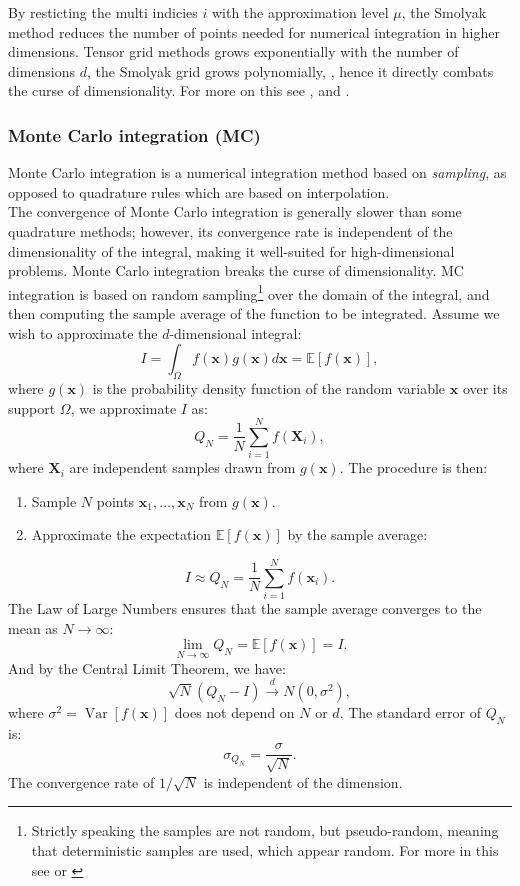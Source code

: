 \documentclass[11pt]{article}
\begin{document}
By resticting the multi indicies \( i \) with the approximation level \( \mu \), the Smolyak method reduces 
the number of points needed for numerical integration in higher dimensions.
Tensor grid methods grows exponentially with the number of dimensions \( d \), the Smolyak grid grows polynomially, \textcite{judd2014smolyak},
hence it directly combats the curse of dimensionality. For more on this see \textcite{smolyak1963}, \textcite{judd2014smolyak} and
\textcite{horneff2016efficient}. 

\subsubsection{Monte Carlo integration (MC)} \label{Subsection: MC}
Monte Carlo integration is a numerical integration method based on \textit{sampling}, as opposed to
quadrature rules which are based on interpolation. \\
The convergence of Monte Carlo integration is generally slower
than some quadrature methods; however, its convergence rate is independent of
the dimensionality of the integral, making it well-suited for high-dimensional problems.
Monte Carlo integration breaks the curse of dimensionality.
\ac{MC} integration is based on random sampling\footnote{Strictly speaking the samples are not random, but pseudo-random, meaning that deterministic samples are used, which appear random. For more in this see \textcite{Judd1998Book} or  \textcite{Glasserman2004MC}}
over the domain of the integral, and then computing the sample average of the function to be integrated.
Assume we wish to approximate the $d$-dimensional integral:
\begin{equation} \label{eq: MC-integral}
  I = \int_{\Omega} f(\mathbf{x}) g(\mathbf{x}) d\mathbf{x} = \mathbb{E}[f(\mathbf{x})],
\end{equation}
where \( g(\mathbf{x}) \) is the probability density function of the random variable \( \mathbf{x} \) over its support \( \Omega \), we approximate \( I \) as:
\begin{equation} \label{eq: MC-integralapproximation}
  Q_N = \frac{1}{N} \sum_{i=1}^{N} f(\mathbf{X}_i),
\end{equation}
where \( \mathbf{X}_i \) are independent samples drawn from \( g(\mathbf{x}) \).
The procedure is then:
\begin{enumerate}
  \item Sample \( N \) points \( \mathbf{x}_1, \ldots, \mathbf{x}_N \) from \( g(\mathbf{x}) \).
  \item Approximate the expectation \( \mathbb{E}[f(\mathbf{x})] \) by the sample average:
\end{enumerate}
\[
I \approx Q_{N} = \frac{1}{N} \sum_{i=1}^{N} f(\mathbf{x}_{i}).
\]
The Law of Large Numbers ensures that the sample average converges to the mean as \( N \to \infty \):
\[
\lim_{{N \to \infty}} Q_{N} = \mathbb{E}[f(\mathbf{x})] = I.
\]
And by the Central Limit Theorem, we have:
\[
\sqrt{N} \left( Q_N - I \right) \xrightarrow{d} N\left(0, \sigma^2 \right),
\]
where \( \sigma^2 = \operatorname{Var}[f(\mathbf{x})] \) does not depend on \( N \) or \( d \). 
The standard error of \( Q_N \) is:
\[
\sigma_{Q_N} = \frac{\sigma}{\sqrt{N}}.
\]
The convergence rate of \( 1/\sqrt{N} \) is independent of the dimension. 
\end{document}
